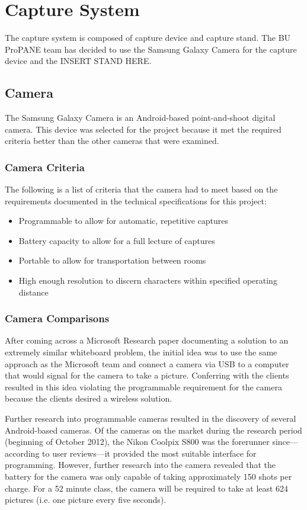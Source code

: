 \documentclass[]{article}
\begin{document}
			
		
	\section{Capture System}
		The capture system is composed of capture device and capture stand. The BU ProPANE team has decided to use the Samsung Galaxy Camera for the capture device and the INSERT STAND HERE. 
			
			\subsection{Camera}
				The Samsung Galaxy Camera is an Android-based point-and-shoot digital camera. This device was selected for the project because it met the required criteria better than the other cameras that were examined. 
				
				\subsubsection{Camera Criteria}
					The following is a list of criteria that the camera had to meet based on the requirements documented in the technical specifications for this project:
					\begin{itemize}
						\item Programmable to allow for automatic, repetitive captures
						\item Battery capacity to allow for a full lecture of captures
						\item Portable to allow for transportation between rooms
						\item High enough resolution to discern characters within specified operating distance
					\end{itemize}
				
				\subsubsection{Camera Comparisons}
					After coming across a Microsoft Research paper documenting a solution to an extremely similar whiteboard problem, the initial idea was to use the same approach as the Microsoft team and connect a camera via USB to a computer that would signal for the camera to take a picture. Conferring with the clients resulted in this idea violating the programmable requirement for the camera because the clients desired a wireless solution. 
					
					Further research into programmable cameras resulted in the discovery of several Android-based cameras. Of the cameras on the market during the research period (beginning of October 2012), the Nikon Coolpix S800 was the forerunner since---according to user reviews---it provided the most suitable interface for programming. However, further research into the camera revealed that the battery for the camera was only capable of taking approximately 150 shots per charge. For a 52 minute class, the camera will be required to take at least 624 pictures (i.e. one picture every five seconds).
					
\end{document}
